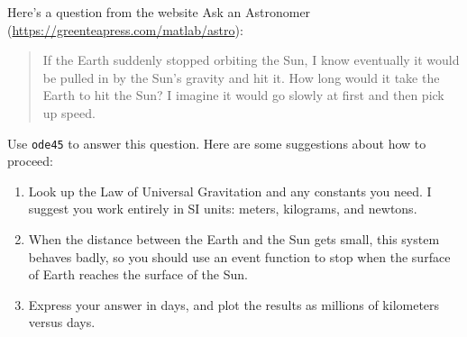 Here's a question from the website Ask an Astronomer (\url{https://greenteapress.com/matlab/astro}):

\begin{quote}
If the Earth suddenly stopped orbiting the Sun, I know eventually it would be pulled in by the Sun's gravity and hit it. How long would it take the Earth to hit the Sun? I imagine it would go slowly at first and then pick up speed.
\end{quote}

Use \lstinline{ode45} to answer this question.  Here are some suggestions about how to proceed:

\begin{enumerate}

\item Look up the Law of Universal Gravitation and any constants you need. I suggest you work entirely in SI units: meters, kilograms, and newtons.

\item When the distance between the Earth and the Sun gets small, this system behaves badly, so you should use an event function to stop when the surface of Earth reaches the surface of the Sun.

\item Express your answer in days, and plot the results as millions of kilometers versus days.

\end{enumerate}





